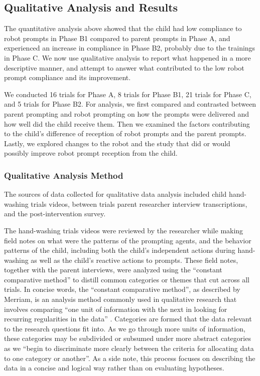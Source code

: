 \subsection{Qualitative Analysis and Results}
\label{sec:QualitativeData_results}
The quantitative analysis above showed that the child had low compliance to robot prompts in Phase B1 compared to parent prompts in Phase A, and experienced an increase in compliance in Phase B2, probably due to the trainings in Phase C.  We now use qualitative analysis to report what happened in a more descriptive manner, and attempt to answer what contributed to the low robot prompt compliance and its improvement.

We conducted 16 trials for Phase A, 8 trials for Phase B1, 21 trials for Phase C, and 5 trials for Phase B2.  For analysis, we first compared and contrasted between parent prompting and robot prompting on how the prompts were delivered and how well did the child receive them.  Then we examined the factors contributing to the child's difference of reception of robot prompts and the parent prompts.  Lastly, we explored changes to the robot and the study that did or would possibly improve robot prompt reception from the child.

\subsubsection{Qualitative Analysis Method}
The sources of data collected for qualitative data analysis included child hand-washing trials videos, between trials parent researcher interview transcriptions, and the post-intervention survey.

The hand-washing trials videos were reviewed by the researcher while making field notes on what were the patterns of the prompting agents, and the behavior patterns of the child, including both the child's independent actions during hand-washing as well as the child's reactive actions to prompts.  These field notes, together with the parent interviews, were analyzed using the ``constant comparative method'' to distill common categories or themes that cut across all trials.  In concise words, the ``constant comparative method'', as described by Merriam, is an analysis method commonly used in qualitative research that involves comparing ``one unit of information with the next in looking for recurring regularities in the data'' \cite{merriam2014qualitative}.  Categories are formed that the data relevant to the research questions fit into.  As we go through more units of information, these categories may be subdivided or subsumed under more abstract categories as we ``begin to discriminate more clearly between the criteria for allocating data to one category or another''.  As a side note, this process focuses on describing the data in a concise and logical way rather than on evaluating hypotheses.


